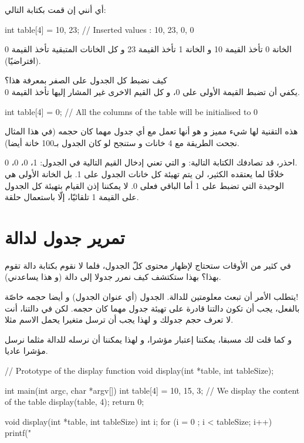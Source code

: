 أي أنني إن قمت بكتابة التالي:

\begin{Csource}
int table[4] = {10, 23}; // Inserted values : 10, 23, 0, 0
\end{Csource}

الخانة 0 تأخذ القيمة 10 و الخانة 1 تأخذ القيمة 23 و كل الخانات المتبقية تأخذ القيمة 0 (افتراضيًا).

كيف نضبط كل الجدول على الصفر بمعرفة هذا؟\\
يكفي أن تضبط القيمة الأولى على 0، و كل القيم الاخرى غير المشار إليها تأخذ القيمة 0.

\begin{Csource}
int table[4] = {0}; // All the columns of the table will be initialised to 0
\end{Csource}

هذه التقنية لها شيء مميز و هو أنها تعمل مع أي جدول مهما كان حجمه (في هذا المثال نجحت الطريقة مع 4 خانات و ستنجح لو كان الجدول بـ100 خانة أيضا).

\begin{critical}
احذر، قد تصادفك الكتابة التالية:
و التي تعني إدخال القيم التالية في الجدول:
1، 0، 0، 0.\\
خلافًا لما يعتقده الكثير، لن يتم تهيئة كل خانات الجدول على 1. بل الخانة الأولى هي الوحيدة التي تضبط على 1 أما الباقي فعلى 0. لا يمكننا إذن القيام بتهيئة كل الجدول على القيمة 1 تلقائيّا، إلّا باستعمال حلقة.
\end{critical}

\section{تمرير جدول لدالة}

في كثير من الأوقات ستحتاج لإظهار محتوى كلّ الجدول، فلما لا نقوم بكتابة دالة تقوم بهذا؟ بهذا ستكتشف كيف نمرر جدولا إلى دالة (و هذا يساعدني).

يتطلب الأمر أن تبعث معلومتين للدالة. الجدول (أي عنوان الجدول) و أيضا حجمه خاصّة!\\
بالفعل، يجب أن تكون دالتنا قادرة على تهيئة جدول مهما كان حجمه. لكن في دالتنا، أنت لا تعرف حجم جدولك و لهذا يجب أن ترسل متغيرا يحمل الاسم
مثلا.

و كما قلت لك مسبقا، يمكننا إعتبار
مؤشرا، و لهذا يمكننا أن نرسله للدالة مثلما نرسل مؤشرا عاديا.

\begin{Csource}
// Prototype of the display function
void display(int *table, int tableSize);

int main(int argc, char *argv[])
{
	int table[4] = {10, 15, 3};
 	// We display the content of the table
	display(table, 4);
	return 0;
}

void display(int *table, int tableSize)
{
	int i;
	for (i = 0 ; i < tableSize; i++)
	{
    		printf("%
	}
}
\end{Csource}

